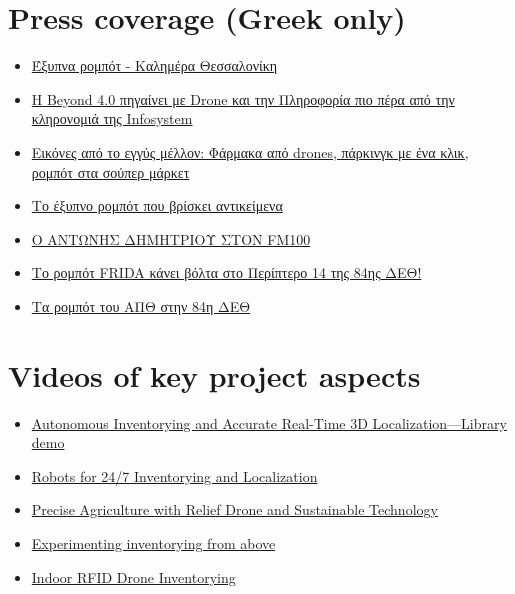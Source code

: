 \newpage

\section{Press coverage (Greek only)}

\begin{itemize}
  \singlespacing
  \item \href{https://www.facebook.com/watch/?v=525073015980746}{Έξυπνα ρομπότ - Καλημέρα Θεσσαλονίκη}
  \item \href{https://www.amna.gr/macedonia/article/593568/I-Beyond-40-pigainei-me-Drone-kai-tin-Pliroforia-pio-pera-apo-tin-klironomia-tis-Infosystem}{Η Beyond 4.0 πηγαίνει με Drone και την Πληροφορία πιο πέρα από την κληρονομιά της Infosystem}
  \item \href{https://www.kathimerini.gr/society/561544489/vinteo-k-eikones-apo-to-eggys-mellon-farmaka-apo-drones-parkingk-me-ena-klik-rompot-sta-soyper-market/}{Εικόνες από το εγγύς μέλλον: Φάρμακα από drones, πάρκινγκ με ένα κλικ, ρομπότ στα σούπερ μάρκετ}
  \item \href{https://www.thessnews.gr/reportaz/to-exypno-robot-pou-vriskei-antikeimena-foto-video/}{Το έξυπνο ρομπότ που βρίσκει αντικείμενα}
  \item \href{https://fm100.gr/media/single/o-antonis-dimitrioy-ston-fm100-o-fm100-stin-84i-deth}{Ο ΑΝΤΩΝΗΣ ΔΗΜΗΤΡΙΟΥ ΣΤΟΝ FM100}
  \item \href{https://www.typosthes.gr/thessaloniki/195192_rompot-frida-kanei-bolta-sto-periptero-14-tis-84is-deth-video}{Το ρομπότ FRIDA κάνει βόλτα στο Περίπτερο 14 της 84ης ΔΕΘ!}
  \item \href{https://www.amna.gr/home/videos/391130/Ta-rompot-tou-APTh-stin-84i-DETh}{Τα ρομπότ του ΑΠΘ στην 84η ΔΕΘ}
\end{itemize}


\section{Videos of key project aspects}

\begin{itemize}
  \singlespacing
  \item \href{https://www.youtube.com/watch?v=bo4lMI640DY}{Autonomous Inventorying and Accurate Real-Time 3D Localization---Library demo}
  \item \href{https://www.facebook.com/watch/?v=960592754415188}{Robots for 24/7 Inventorying and Localization}
  \item \href{https://www.facebook.com/watch/?v=1009958989425825}{Precise Agriculture with Relief Drone and Sustainable Technology}
  \item \href{https://www.facebook.com/watch/?v=1183283855348186}{Experimenting inventorying from above}
  \item \href{https://www.youtube.com/watch?v=9YpBIaO4tgY}{Indoor RFID Drone Inventorying}
\end{itemize}


